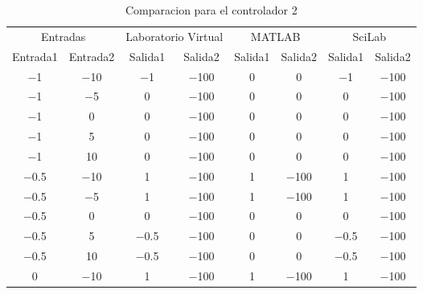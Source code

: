         {\setlength\LTleft{0pt}
        \setlength\LTright{0pt}
        \centering
        \scriptsize
        \renewcommand{\arraystretch}{0.89}
        \begin{longtable}{c @{\extracolsep{\fill}} ccccccc}
        \caption[Comparacion de diseño de controladores difusos - controlador 2]{Comparacion para el controlador 2} 
        \label{tab:C2Difuso} \\
        \toprule
        \multicolumn{2}{c}{Entradas}& \multicolumn{2}{c}{Laboratorio Virtual} & \multicolumn{2}{c}{MATLAB} & \multicolumn{2}{c}{SciLab} \\ \cmidrule{1-2}\cmidrule{3-4}\cmidrule{5-6}\cmidrule{7-8}
        Entrada1   & Entrada2  & Salida1    & Salida2    & Salida1   & Salida2    & Salida1    & Salida2     \\ \cmidrule{1-1}\cmidrule{2-2} \cmidrule{3-3}\cmidrule{4-4}\cmidrule{5-5}\cmidrule{6-6}\cmidrule{7-7}\cmidrule{8-8} 
        \endhead
        \num{-1}   & \num{-10} & \num{-1}   & \num{-100} & \num{0}   & \num{0}    & \num{-1}   & \num{-100}  \\
        \num{-1}   & \num{-5}  & \num{0}    & \num{-100} & \num{0}   & \num{0}    & \num{0}    & \num{-100}  \\
        \num{-1}   & \num{0}   & \num{0}    & \num{-100} & \num{0}   & \num{0}    & \num{0}    & \num{-100}  \\
        \num{-1}   & \num{5}   & \num{0}    & \num{-100} & \num{0}   & \num{0}    & \num{0}    & \num{-100}  \\
        \num{-1}   & \num{10}  & \num{0}    & \num{-100} & \num{0}   & \num{0}    & \num{0}    & \num{-100}  \\
        \num{-0.5} & \num{-10} & \num{1}    & \num{-100} & \num{1}   & \num{-100} & \num{1}    & \num{-100}  \\
        \num{-0.5} & \num{-5}  & \num{1}    & \num{-100} & \num{1}   & \num{-100} & \num{1}    & \num{-100}  \\
        \num{-0.5} & \num{0}   & \num{0}    & \num{-100} & \num{0}   & \num{0}    & \num{0}    & \num{-100}  \\
        \num{-0.5} & \num{5}   & \num{-0.5} & \num{-100} & \num{0}   & \num{0}    & \num{-0.5} & \num{-100}  \\
        \num{-0.5} & \num{10}  & \num{-0.5} & \num{-100} & \num{0}   & \num{0}    & \num{-0.5} & \num{-100}  \\
        \num{0}    & \num{-10} & \num{1}    & \num{-100} & \num{1}   & \num{-100} & \num{1}    & \num{-100}  \\

\end{longtable}}
